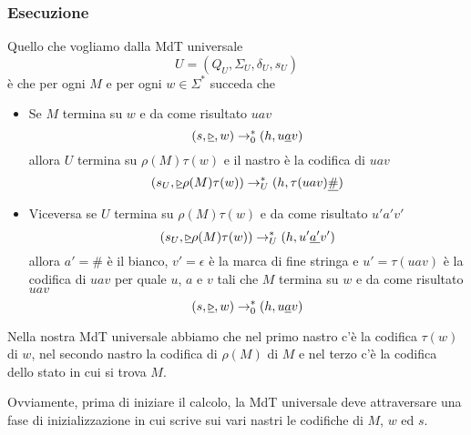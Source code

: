 \subsubsection{Esecuzione}
Quello che vogliamo dalla MdT universale
\[ U = (Q_U, \Sigma_U, \delta_U, s_U) \]
è che per ogni $M$ e per ogni $w \in \Sigma^*$ succeda che
\begin{itemize}
	\item Se $M$ termina su $w$ e da come risultato $uav$
	      \[
		      (s, \underline{\triangleright}, w) \rightarrow^*_0
		      (h, u \underline{a} v)
	      \]
	      allora $U$ termina su $\rho(M) \tau(w)$ e il nastro è
	      la codifica di $uav$
	      \[
		      (s_U, \underline{\triangleright} \rho(M) \tau(w))
		      \rightarrow^*_U (h, \tau(uav) \underline{\#})
	      \]
	\item Viceversa se $U$ termina su $\rho(M) \tau(w)$ e da come
	      risultato $u'a'v'$
	      \[
		      (s_U, \underline{\triangleright} \rho(M) \tau(w))
		      \rightarrow^*_U (h, u' \underline{a'}v')
	      \]
	      allora $a' = \#$ è il bianco, $v' = \epsilon$ è la
	      marca di fine stringa e $u' = \tau(uav)$ è la codifica
	      di $uav$ per quale $u$, $a$ e $v$ tali che $M$ termina
	      su $w$ e da come risultato $uav$
	      \[
		      (s, \underline{\triangleright}, w) \rightarrow^*_0
		      (h, u \underline{a} v)
	      \]
\end{itemize}
Nella nostra MdT universale abbiamo che nel primo nastro c'è la
codifica $\tau(w)$ di $w$, nel secondo nastro la codifica di
$\rho(M)$ di $M$ e nel terzo c'è la codifica dello stato in cui
si trova $M$.

Ovviamente, prima di iniziare il calcolo, la MdT universale deve
attraversare una fase di inizializzazione in cui scrive sui vari
nastri le codifiche di $M$, $w$ ed $s$.

